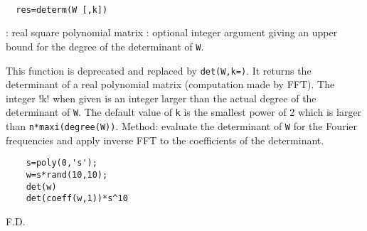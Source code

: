 
\begin{mandesc}
   \\ %
\end{mandesc}
\begin{calling_sequence}
\begin{verbatim}
  res=determ(W [,k])
\end{verbatim}
\end{calling_sequence}
\begin{parameters}
  \begin{varlist}
    : real square polynomial matrix
    : optional integer argument giving an upper bound for the degree of the determinant of \verb!W!.
  \end{varlist}
\end{parameters}
\begin{mandescription}
  This function is deprecated and replaced by \verb!det(W,k=)!. It returns the determinant of a real polynomial matrix 
  (computation made by FFT). The integer !k! when given is an integer larger than the actual degree of the determinant
  of \verb!W!.
  The default value of \verb!k! is the smallest power of 2 which is larger
  than \verb!n*maxi(degree(W))!.
  Method: evaluate the determinant of \verb!W! for the Fourier frequencies
  and apply inverse FFT to the coefficients of the determinant.
\end{mandescription}
\begin{examples}
  \begin{Verbatim}
    s=poly(0,'s');
    w=s*rand(10,10);
    det(w)
    det(coeff(w,1))*s^10
  \end{Verbatim}
\end{examples}
\begin{manseealso}
      
\end{manseealso}
\begin{authors}
  F.D.  
\end{authors}
